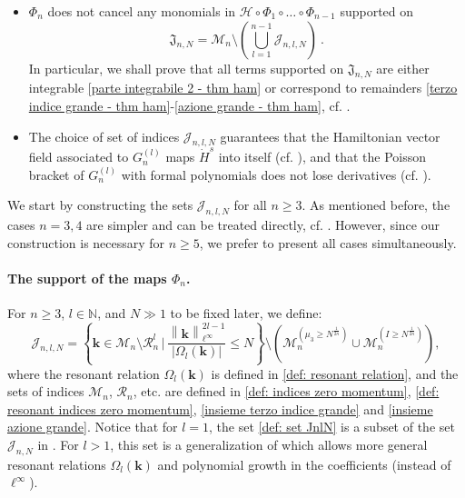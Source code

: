 \documentclass[a4paper,10pt,reqno]{article}
\theoremstyle{definition}
\theoremstyle{plain}
\theoremstyle{plain}
\theoremstyle{definition}
\theoremstyle{plain}
\theoremstyle{plain}
\theoremstyle{plain}
\theoremstyle{definition}
\theoremstyle{definition}
\newcommand{\norm}[1]{\left\lVert #1 \right\rVert}
\def \N{\mathbb N}
\def \H{\mathcal{H}}
\def \M{\mathcal{M}}
\def \k{\bm{k}}
\begin{document}
\begin{itemize}
    \item $\Phi_n$ does not cancel any monomials in $\H\circ \Phi_1\circ\ldots\circ\Phi_{n-1}$ supported on 
    \begin{equation}\label{eq:complement of J-indices}
    \mathfrak{J}_{n,N} = \M_n \setminus \left ( \bigcup_{l = 1}^{n-1} \mathcal{J}_{n,l,N} \right ) \ .
    \end{equation}
    In particular, we shall prove that all terms supported on $\mathfrak{J}_{n,N}$ are either integrable \eqref{parte integrabile 2 - thm ham} or correspond to remainders \eqref{terzo indice grande - thm ham}-\eqref{azione grande - thm ham}, cf. .
    
    \item The choice of set of indices $\mathcal{J}_{n,l,N}$ guarantees that the Hamiltonian vector field associated to $G_n^{(l)}$ maps $\dot{H}^s$ into itself (cf. ), and that the Poisson bracket of $G_n^{(l)}$ with formal polynomials does not lose derivatives (cf. ).
\end{itemize}

We start by constructing the sets $\mathcal{J}_{n,l,N}$ for all $n\geq 3$. As mentioned before, the cases $n=3,4$ are simpler and can be treated directly, cf. . However, since our construction is necessary for $n\geq 5$, we prefer to present all cases simultaneously.

\paragraph{The support of the maps $\Phi_n$.} 
For $n \ge 3$, $l \in \N$, and $N \gg 1$ to be fixed later, we define:
\begin{equation} \label{def: set JnlN}
\mathcal{J}_{n,l,N} = \left \{ \k \in \M_n \setminus \mathcal{R}_n^l \, \bigg | \,  \dfrac{\norm{\k}_{\ell^{\infty}}^{2l-1}}{|\Omega_l(\k)|} \le N \right \} \setminus \left (  \M_n^{(\mu_3 \ge N^{\frac{1}{2n}})} \cup \M_n^{(I \ge N^{\frac{1}{2n}})} \right ), 
\end{equation}
where the resonant relation $\Omega_l(\k)$ is defined in \eqref{def: resonant relation}, and the sets of indices $\M_n$, $\mathcal{R}_n$, etc. are defined in \eqref{def: indices zero momentum}, \eqref{def: resonant indices zero momentum}, \eqref{insieme terzo indice grande} and \eqref{insieme azione grande}.
Notice that for $l = 1$, the set \eqref{def: set JnlN} is a subset of the set $\mathcal{J}_{n,N}$ in \cite[Definition 3.5]{bernier}. 
For $l>1$, this set is a generalization of \cite[Definition 3.5]{bernier} which allows more general resonant relations $\Omega_l (\k)$ and polynomial growth in the coefficients (instead of $\ell^{\infty}$).
\end{document}
